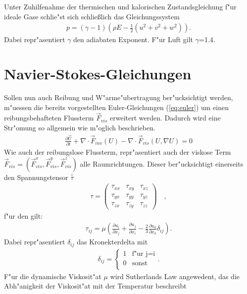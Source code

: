 Unter Zuhilfenahme der thermischen und kalorischen Zustandsgleichung f"ur ideale Gase schlie"st sich schließlich das Gleichungssystem
\begin{gather}
p = (\gamma -1)(\rho E - \frac{1}{2}(u^{2}+v^{2}+w^{2})).
\end{gather}
Dabei repr"asentiert $\gamma$ den adiabaten Exponent. F"ur Luft gilt $\gamma$=1.4.




\section{Navier-Stokes-Gleichungen}
Sollen nun auch Reibung und W"arme"ubertragung ber"ucksichtigt werden, m"uessen die bereits vorgestellten Euler-Gleichungen (\ref{eq:euler}) um einen reibungsbehafteten Flussterm $\vec F_{vis}$ erweitert werden. Dadurch wird eine Str"omung so allgemein wie m"oglich beschrieben.
\begin{gather}\label{eq:ns}
	\frac{\partial\vec{U}}{\partial t} + \nabla \cdot \vec F_{inv}(U) -  \nabla \cdot \vec F_{vis}(U, \nabla U)= 0
\end{gather}
Wie auch der reibungslose Flussterm, repr"asentiert auch der viskose Term $\vec F_{vis}=(\vec F^{x}_{vis}, \vec F^{y}_{vis}, \vec F^{z}_{vis})$ alle Raumrichtungen. Dieser ber"ucksichtigt einerseits den Spannungstensor $\bar{\bar{\tau}}$
\begin{gather}
	\tau=\begin{pmatrix} 
	\tau_{xx} & \tau_{xy} & \tau_{xz}\\
	\tau_{yx} & \tau_{yy} & \tau_{yz}\\
	\tau_{zx} & \tau_{zy} & \tau_{zz}
	\end{pmatrix}
	\quad,
\end{gather}
f"ur den gilt:
\begin{gather}
	\tau_{ij}=\mu \left(\frac{\partial u_{i}}{\partial x_{j}} +\frac{\partial u_{j}}{\partial x_{i}} - \frac{2}{3}\frac{\partial u_{k}}{\partial x_{k}}\delta_{ij} \right) .
\end{gather}
Dabei repr"asentiert $\delta_{ij}$ das Kronekterdelta mit
\begin{gather}
	\delta_{ij}=\begin{cases} 
	1 & \text{f"ur j=i}\\
	0 & \text{sonst}\\
	\end{cases}.
\end{gather}
F"ur die dynamische Viskosit"at $\mu$ wird Sutherlands Law angewedent, das die Abh"anigkeit der Viskosit"at mit der Temperatur beschreibt
